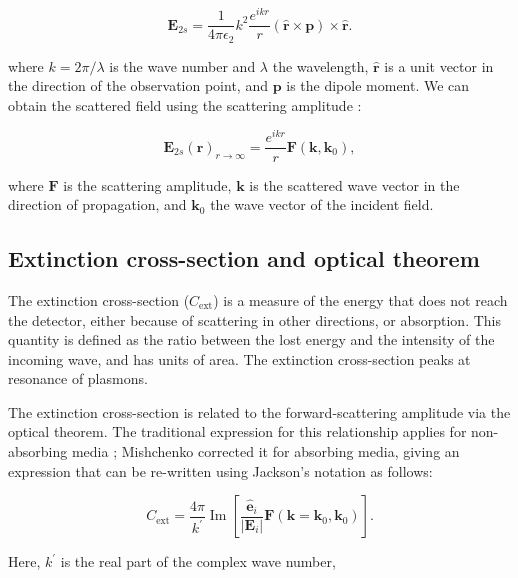 \begin{equation} \label{eq:scat_efield_long_range}
    \mathbf{E}_{2s} = \frac{1}{4\pi\epsilon_2}k^2\frac{e^{ikr}}{r} (\mathbf{\hat{r}} \times \mathbf{p})\times\mathbf{\hat{r}}.
\end{equation} 

where $k=2\pi/\lambda$ is the wave number and $\lambda$ the wavelength, $\mathbf{\hat{r}}$ 
is a unit vector in the direction of the observation point, and $\mathbf{p}$ is
the dipole moment.
We can obtain the scattered field using the 
scattering amplitude \cite{Jackson}:

\begin{equation} \label{eq:scat_efield_fwa}
    \mathbf{E}_{2s}(\mathbf{r})_{r\to\infty} = \frac{e^{ikr}}{r} \mathbf{F}(\mathbf{k},\mathbf{k}_0),
\end{equation}

where $\mathbf{F}$ is the scattering amplitude, $\mathbf{k}$ is the 
scattered wave vector in the direction of propagation, and $\mathbf{k}_0$ the 
wave vector of the incident field. 

\subsection{Extinction cross-section and optical theorem} \label{sec:cext_ot}

The extinction cross-section ($C_\text{ext}$) is a measure of the energy that 
does not reach the detector, either because of scattering in other directions,
or absorption. This quantity is defined as the ratio between the lost energy and 
the intensity of the incoming wave, and has units of area. 
The extinction cross-section peaks at resonance of plasmons.

The extinction cross-section is related to the forward-scattering amplitude via the optical theorem. 
The traditional expression for this relationship applies for non-absorbing media 
\cite{MayergoyzZhang2007, Jackson}; Mishchenko \cite{Mishchenko2007} corrected it for absorbing media, 
giving an expression that can be re-written using Jackson's notation \cite{Jackson} as follows:

\begin{equation} \label{eq:cext_fwa}
    C_\text{ext} = \frac{4\pi}{k^\prime} \operatorname{Im} \left[ \frac{\mathbf{\hat{e}}_i}{|\mathbf{E}_i|}\mathbf{F}(\mathbf{k}=\mathbf{k}_0, \mathbf{k}_0) \right].
\end{equation}

Here, $k^\prime$ is the real part of the complex wave number, 

